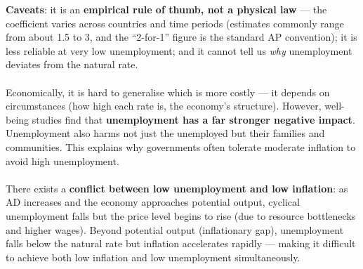\textbf{Caveats}: it is an \textbf{empirical rule of thumb, not a physical law} --- the coefficient varies across countries and time periods (estimates commonly range from about 1.5 to 3, and the ``2-for-1'' figure is the standard AP convention); it is less reliable at very low unemployment; and it cannot tell us \textit{why} unemployment deviates from the natural rate.
\\\\
Economically, it is hard to generalise which is more costly --- it depends on circumstances (how high each rate is, the economy's structure). However, well-being studies find that \textbf{unemployment has a far stronger negative impact}. Unemployment also harms not just the unemployed but their families and communities. This explains why governments often tolerate moderate inflation to avoid high unemployment.\\\\
There exists a \textbf{conflict between low unemployment and low inflation}: as AD increases and the economy approaches potential output, cyclical unemployment falls but the price level begins to rise (due to resource bottlenecks and higher wages). Beyond potential output (inflationary gap), unemployment falls below the natural rate but inflation accelerates rapidly --- making it difficult to achieve both low inflation and low unemployment simultaneously.
